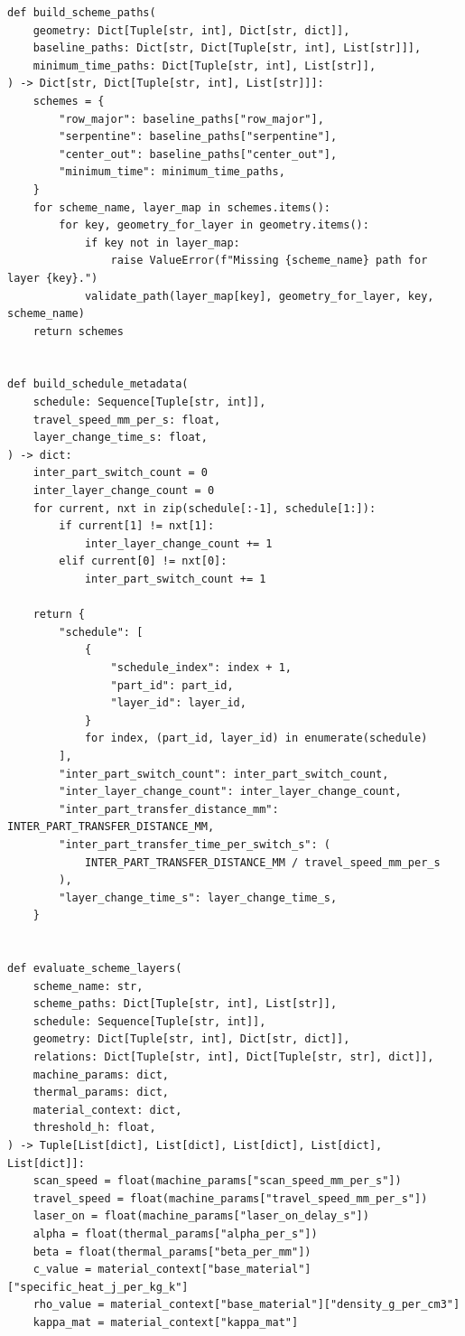 \documentclass[a4paper, 12pt]{ctexart}
\begin{document}
\begin{verbatim}
def build_scheme_paths(
    geometry: Dict[Tuple[str, int], Dict[str, dict]],
    baseline_paths: Dict[str, Dict[Tuple[str, int], List[str]]],
    minimum_time_paths: Dict[Tuple[str, int], List[str]],
) -> Dict[str, Dict[Tuple[str, int], List[str]]]:
    schemes = {
        "row_major": baseline_paths["row_major"],
        "serpentine": baseline_paths["serpentine"],
        "center_out": baseline_paths["center_out"],
        "minimum_time": minimum_time_paths,
    }
    for scheme_name, layer_map in schemes.items():
        for key, geometry_for_layer in geometry.items():
            if key not in layer_map:
                raise ValueError(f"Missing {scheme_name} path for layer {key}.")
            validate_path(layer_map[key], geometry_for_layer, key, scheme_name)
    return schemes


def build_schedule_metadata(
    schedule: Sequence[Tuple[str, int]],
    travel_speed_mm_per_s: float,
    layer_change_time_s: float,
) -> dict:
    inter_part_switch_count = 0
    inter_layer_change_count = 0
    for current, nxt in zip(schedule[:-1], schedule[1:]):
        if current[1] != nxt[1]:
            inter_layer_change_count += 1
        elif current[0] != nxt[0]:
            inter_part_switch_count += 1

    return {
        "schedule": [
            {
                "schedule_index": index + 1,
                "part_id": part_id,
                "layer_id": layer_id,
            }
            for index, (part_id, layer_id) in enumerate(schedule)
        ],
        "inter_part_switch_count": inter_part_switch_count,
        "inter_layer_change_count": inter_layer_change_count,
        "inter_part_transfer_distance_mm": INTER_PART_TRANSFER_DISTANCE_MM,
        "inter_part_transfer_time_per_switch_s": (
            INTER_PART_TRANSFER_DISTANCE_MM / travel_speed_mm_per_s
        ),
        "layer_change_time_s": layer_change_time_s,
    }


def evaluate_scheme_layers(
    scheme_name: str,
    scheme_paths: Dict[Tuple[str, int], List[str]],
    schedule: Sequence[Tuple[str, int]],
    geometry: Dict[Tuple[str, int], Dict[str, dict]],
    relations: Dict[Tuple[str, int], Dict[Tuple[str, str], dict]],
    machine_params: dict,
    thermal_params: dict,
    material_context: dict,
    threshold_h: float,
) -> Tuple[List[dict], List[dict], List[dict], List[dict], List[dict]]:
    scan_speed = float(machine_params["scan_speed_mm_per_s"])
    travel_speed = float(machine_params["travel_speed_mm_per_s"])
    laser_on = float(machine_params["laser_on_delay_s"])
    alpha = float(thermal_params["alpha_per_s"])
    beta = float(thermal_params["beta_per_mm"])
    c_value = material_context["base_material"]["specific_heat_j_per_kg_k"]
    rho_value = material_context["base_material"]["density_g_per_cm3"]
    kappa_mat = material_context["kappa_mat"]


\end{verbatim}
\end{document}
